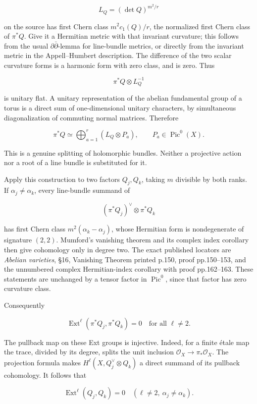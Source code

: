 \[
 L_Q=(\det Q)^{m^2/r}
 \tag{E813.10}
\]

on the source has first Chern class \(m^2c_1(Q)/r\), the normalized
first Chern class of \(\pi^*Q\). Give it a Hermitian metric with that
invariant curvature; this follows from the usual
\(\partial\bar\partial\)-lemma for line-bundle metrics, or directly from
the invariant metric in the Appell--Humbert description. The difference
of the two scalar curvature forms is a harmonic form with zero class,
and is zero. Thus

\[
 \pi^*Q\otimes L_Q^{-1}
\]

is unitary flat. A unitary representation of the abelian fundamental
group of a torus is a direct sum of one-dimensional unitary characters,
by simultaneous diagonalization of commuting normal matrices. Therefore

\[
 \pi^*Q\simeq\bigoplus_{a=1}^r (L_Q\otimes P_a),
 \qquad P_a\in\operatorname{Pic}^0(X).
 \tag{E813.11}
\]

This is a genuine splitting of holomorphic bundles. Neither a projective
action nor a root of a line bundle is substituted for it.

Apply this construction to two factors \(Q_j,Q_k\), taking \(m\)
divisible by both ranks. If \(\alpha_j\ne\alpha_k\), every line-bundle
summand of

\[
 (\pi^*Q_j)^\vee\otimes\pi^*Q_k
\]

has first Chern class \(m^2(\alpha_k-\alpha_j)\), whose Hermitian form
is nondegenerate of signature \((2,2)\). Mumford's vanishing theorem and
its complex index corollary then give cohomology only in degree two. The
exact published locators are \emph{Abelian varieties}, §16, Vanishing
Theorem printed p.150, proof pp.150--153, and the unnumbered complex
Hermitian-index corollary with proof pp.162--163. These statements are
unchanged by a tensor factor in \(\operatorname{Pic}^0\), since that
factor has zero curvature class.

Consequently

\[
 \operatorname{Ext}^{\ell}(\pi^*Q_j,\pi^*Q_k)=0
 \quad\text{for all }\ell\ne2.
 \tag{E813.12}
\]

The pullback map on these Ext groups is injective. Indeed, for a finite
étale map the trace, divided by its degree, splits the unit inclusion
\(\mathcal O_X\to\pi_*\mathcal O_X\). The projection formula makes
\(H^{\ell}(X,Q_j^\vee\otimes Q_k)\) a direct summand of its pullback
cohomology. It follows that

\[
 \operatorname{Ext}^{\ell}(Q_j,Q_k)=0
 \quad(\ell\ne2,\ \alpha_j\ne\alpha_k).
 \tag{E813.13}
\]

